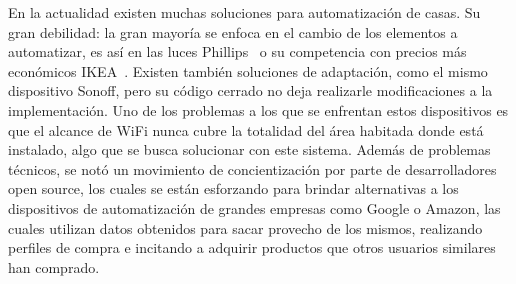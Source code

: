En la actualidad existen muchas soluciones para automatización de casas. Su gran debilidad: la gran mayoría se enfoca en el cambio de los elementos a automatizar, es así en las luces Phillips~\cite{phillips-lighting} o su competencia con precios más económicos IKEA~\cite{ikea-lighting}. Existen también soluciones de adaptación, como el mismo dispositivo Sonoff, pero su código cerrado no deja realizarle modificaciones a la implementación. 
Uno de los problemas a los que se enfrentan estos dispositivos es que el alcance de WiFi nunca cubre la totalidad del área habitada donde está instalado, algo que se busca solucionar con este sistema. Además de problemas técnicos, se notó un movimiento de concientización por parte de desarrolladores open source, los cuales se están esforzando para brindar alternativas a los dispositivos de automatización de grandes empresas como Google o Amazon, las cuales utilizan datos obtenidos para sacar provecho de los mismos, realizando perfiles de compra e incitando a adquirir productos que otros usuarios similares han comprado.

